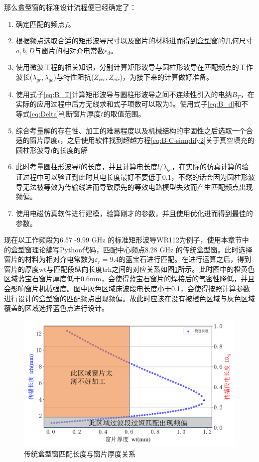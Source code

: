 \documentclass[master]{thesis-uestc}
\begin{document}
那么盒型窗的标准设计流程便已经确定了：
\begin{enumerate}
    \item 确定匹配的频点$f$。
    \item 根据频点选取合适的矩形波导尺寸以及窗片的材料进而得到盒型窗的几何尺寸$a, b, D$与窗片的相对介电常数$\varepsilon_{d}$。
    \item 使用微波工程的相关知识，分别计算矩形波导与圆柱形波导在匹配频点的工作波长($\lambda_{gr}, \lambda_{gc}$)与特性阻抗($Z_{rec}, Z_{cir}$)，为接下来的计算做好准备。
    \item 使用式子\ref{eq:B_T}计算矩形波导与圆柱形波导之间不连续性引入的电纳$B_T$，在实际的应用过程中后方无线求和式子项数可以取为5。使用式子\ref{eq:B_d}和不等式\ref{eq:Delta}判断窗片厚度$t$的取值范围。
    \item 综合考量解的存在性、加工的难易程度以及机械结构的牢固性之后选取一个合适的窗片厚度$t$，之后使用软件找到超越方程\ref{eq:B-C-simplify2}关于真空填充的圆柱形波导$l$的长度的解
    \item 此时考量圆柱形波导$l$的长度，并且计算电长度$l / \lambda_{gc}$，在实际的仿真计算的验证过程中可以验证到此时其电长度最好不要低于0.1，不然的话会因为圆柱形波导无法被等效为传输线进而导致原先的等效电路模型失效而产生匹配频点出现频偏。
    \item 使用电磁仿真软件进行建模，验算刚才的参数，并且使用优化进而得到最佳的参数。
\end{enumerate}

现在以工作频段为6.57 -9.99 GHz 的标准矩形波导WR112为例子，使用本章节中的盒型窗理论编写Python代码，匹配中心频点8.28 GHz 的传统盒型窗。此时选择窗片的材料为相对介电常数为\( \varepsilon_r = 9.4\)的蓝宝石进行匹配。在进行运算之后，得到窗片的厚度wt与匹配段纵向长度trh之间的对应关系如图\ref{fig:传统盒型窗匹配长度与窗片厚度关系}所示。此时图中的橙黄色区域蓝宝石窗片厚度低于0.6mm，会使得蓝宝石窗片的焊接后的气密性降低，并且会影响窗片机械强度。图中灰色区域床波段电长度小于0.1，会使得按照计算参数进行设计的盒型窗的匹配频点出现频偏。故此时应该在没有被橙色区域与灰色区域覆盖的区域选择蓝色点进行设计。
\begin{figure}[!htb]
    \includegraphics[width=0.45\linewidth]{pic/chapter2/传统盒型窗匹配长度与窗片厚度关系.png}
    \caption{传统盒型窗匹配长度与窗片厚度关系}
    \label{fig:传统盒型窗匹配长度与窗片厚度关系}
\end{figure}
\end{document}
